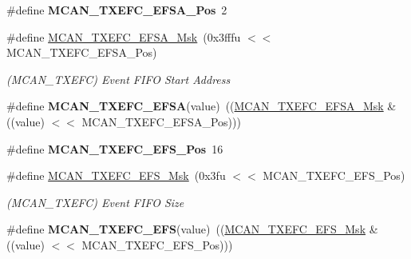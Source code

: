 \begin{DoxyCompactItemize}
\#define {\bfseries M\+C\+A\+N\+\_\+\+T\+X\+E\+F\+C\+\_\+\+E\+F\+S\+A\+\_\+\+Pos}~2
\item 
\mbox{\label{group__SAMV71__MCAN_ga4cb8e1663610473ab0ca7201eb5f4393}} 
\#define \mbox{\hyperlink{group__SAMV71__MCAN_ga4cb8e1663610473ab0ca7201eb5f4393}{M\+C\+A\+N\+\_\+\+T\+X\+E\+F\+C\+\_\+\+E\+F\+S\+A\+\_\+\+Msk}}~(0x3fffu $<$$<$ M\+C\+A\+N\+\_\+\+T\+X\+E\+F\+C\+\_\+\+E\+F\+S\+A\+\_\+\+Pos)
\begin{DoxyCompactList}\small\item\em (M\+C\+A\+N\+\_\+\+T\+X\+E\+FC) Event F\+I\+FO Start Address \end{DoxyCompactList}\item 
\mbox{\label{group__SAMV71__MCAN_ga5521d7f63ca5f5eec14ff5f310eb8f72}} 
\#define {\bfseries M\+C\+A\+N\+\_\+\+T\+X\+E\+F\+C\+\_\+\+E\+F\+SA}(value)~((\mbox{\hyperlink{group__SAMV71__MCAN_ga4cb8e1663610473ab0ca7201eb5f4393}{M\+C\+A\+N\+\_\+\+T\+X\+E\+F\+C\+\_\+\+E\+F\+S\+A\+\_\+\+Msk}} \& ((value) $<$$<$ M\+C\+A\+N\+\_\+\+T\+X\+E\+F\+C\+\_\+\+E\+F\+S\+A\+\_\+\+Pos)))
\item 
\mbox{\label{group__SAMV71__MCAN_ga4c06b7b0489a98ca51a9400953c4e852}} 
\#define {\bfseries M\+C\+A\+N\+\_\+\+T\+X\+E\+F\+C\+\_\+\+E\+F\+S\+\_\+\+Pos}~16
\item 
\mbox{\label{group__SAMV71__MCAN_ga4eb341c9fd9466c3cee042a56566cc19}} 
\#define \mbox{\hyperlink{group__SAMV71__MCAN_ga4eb341c9fd9466c3cee042a56566cc19}{M\+C\+A\+N\+\_\+\+T\+X\+E\+F\+C\+\_\+\+E\+F\+S\+\_\+\+Msk}}~(0x3fu $<$$<$ M\+C\+A\+N\+\_\+\+T\+X\+E\+F\+C\+\_\+\+E\+F\+S\+\_\+\+Pos)
\begin{DoxyCompactList}\small\item\em (M\+C\+A\+N\+\_\+\+T\+X\+E\+FC) Event F\+I\+FO Size \end{DoxyCompactList}\item 
\mbox{\label{group__SAMV71__MCAN_ga4bc24b1811aee4fe2e4158aa907347bb}} 
\#define {\bfseries M\+C\+A\+N\+\_\+\+T\+X\+E\+F\+C\+\_\+\+E\+FS}(value)~((\mbox{\hyperlink{group__SAMV71__MCAN_ga4eb341c9fd9466c3cee042a56566cc19}{M\+C\+A\+N\+\_\+\+T\+X\+E\+F\+C\+\_\+\+E\+F\+S\+\_\+\+Msk}} \& ((value) $<$$<$ M\+C\+A\+N\+\_\+\+T\+X\+E\+F\+C\+\_\+\+E\+F\+S\+\_\+\+Pos)))
\item 

\end{DoxyCompactItemize}
